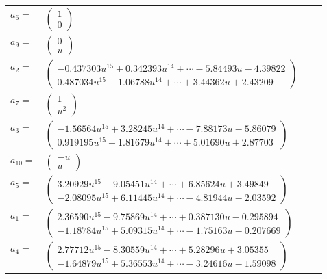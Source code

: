\documentclass[1p]{elsarticle_modified}
\theoremstyle{definition}
\begin{document}
\begin{tabular}{m{7pt} m{180pt} m{7pt} m{180pt} }
\flushright $a_{6}=$&$\begin{pmatrix}1\\0\end{pmatrix}$ \\
\flushright $a_{9}=$&$\begin{pmatrix}0\\u\end{pmatrix}$ \\
\flushright $a_{2}=$&$\begin{pmatrix}-0.437303 u^{15}+0.342393 u^{14}+\cdots-5.84493 u-4.39822\\0.487034 u^{15}-1.06788 u^{14}+\cdots+3.44362 u+2.43209\end{pmatrix}$ \\
\flushright $a_{7}=$&$\begin{pmatrix}1\\u^2\end{pmatrix}$ \\
\flushright $a_{3}=$&$\begin{pmatrix}-1.56564 u^{15}+3.28245 u^{14}+\cdots-7.88173 u-5.86079\\0.919195 u^{15}-1.81679 u^{14}+\cdots+5.01690 u+2.87703\end{pmatrix}$ \\
\flushright $a_{10}=$&$\begin{pmatrix}- u\\u\end{pmatrix}$ \\
\flushright $a_{5}=$&$\begin{pmatrix}3.20929 u^{15}-9.05451 u^{14}+\cdots+6.85624 u+3.49849\\-2.08095 u^{15}+6.11445 u^{14}+\cdots-4.81944 u-2.03592\end{pmatrix}$ \\
\flushright $a_{1}=$&$\begin{pmatrix}2.36590 u^{15}-9.75869 u^{14}+\cdots+0.387130 u-0.295894\\-1.18784 u^{15}+5.09315 u^{14}+\cdots-1.75163 u-0.207669\end{pmatrix}$ \\
\flushright $a_{4}=$&$\begin{pmatrix}2.77712 u^{15}-8.30559 u^{14}+\cdots+5.28296 u+3.05355\\-1.64879 u^{15}+5.36553 u^{14}+\cdots-3.24616 u-1.59098\end{pmatrix}$ \\

\end{tabular}
\end{document}
